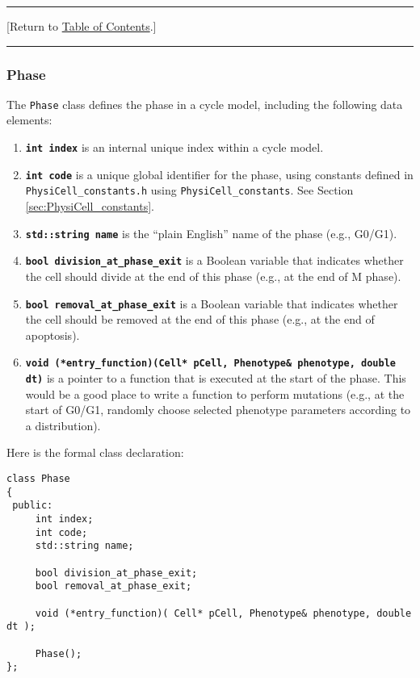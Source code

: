 \documentclass[12pt]{article}
\renewcommand{\v}{\verb}
\newcommand{\smallcode}[1]{\textbf{\texttt{#1}}}
\newcommand{\blue}[1]{\textcolor{blue}{#1}}
\newcommand{\DONE}{}%
\newcommand{\TOClink}{\begin{center}\hrule\vskip-10pt\phantom{.}\hfill[Return to \hyperlink{TOC}{Table of Contents}.]\hfill\phantom{.}\vskip3pt\hrule\end{center}}
\begin{document}
\TOClink 

\subsubsection{Phase \DONE}
\label{sec:Phase}
The \v|Phase| class defines the phase in a cycle model, including the following data elements:

\begin{enumerate}
\item
\smallcode{int index} is an internal unique index within a cycle model. 

\item
\smallcode{int code} is a unique global identifier for the phase, using constants defined in \hfill\break
\v|PhysiCell_constants.h| using \v|PhysiCell_constants|. 
See Section \ref{sec:PhysiCell_constants}.

\item 
\smallcode{std::string name} is the ``plain English'' name of the phase (e.g., G0/G1). 

\item 
\smallcode{bool division\_at\_phase\_exit} is a Boolean variable that indicates whether the cell 
should divide at the end of this phase (e.g., at the end of M phase). 

\item 
\smallcode{bool removal\_at\_phase\_exit} is a Boolean variable that indicates whether the cell 
should be removed at the end of this phase (e.g., at the end of apoptosis). 

\item 
\smallcode{void (*entry\_function)(Cell* pCell, Phenotype\& phenotype, double dt)} is a 
pointer to a function that is 
executed at the start of the phase. This would be a good place to write a function to 
perform mutations (e.g., at the start of G0/G1, randomly choose selected phenotype 
parameters according to a distribution). 
\end{enumerate}

Here is the formal class declaration:
\begin{verbatim}
class Phase
{
 public:
     int index;
     int code; 
     std::string name; 
     
     bool division_at_phase_exit; 
     bool removal_at_phase_exit; 
     
     void (*entry_function)( Cell* pCell, Phenotype& phenotype, double dt ); 
     
     Phase();
};
\end{verbatim}
\end{document}
